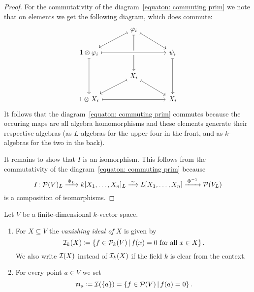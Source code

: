 \begin{proof}
    For the commutativity of the diagram~\eqref{equaton: commuting prim} we note that on elements we get the following diagram, which does commute:
    \[
      \begin{tikzcd}[column sep = large]
          {}
        & \varphi_i
          \arrow[mapsto]{dl}
          \arrow[mapsto]{dr}
          \arrow[mapsto]{dd}
        & {}
        \\
          1 \otimes \varphi_i
          \arrow[crossing over, mapsto]{rr}
          \arrow[mapsto]{dd}
        & {}
        & \psi_i
          \arrow[mapsto]{dd}
        \\
          {}
        & X_i
          \arrow[mapsto]{dl}
          \arrow[mapsto]{dr}
        & {}
        \\
          1 \otimes X_i
          \arrow[mapsto]{rr}
        & {}
        & X_i
      \end{tikzcd}
    \]
    It follows that the diagram~\eqref{equaton: commuting prim} commutes because the occuring maps are all algebra homomorphisms and these elements generate their respective algebras (as $L$-algebras for the upper four in the front, and as $k$-algebras for the two in the back).
    
    It remains to show that $I$ is an isomorphism.
    This follows from the commutativity of the diagram~\eqref{equaton: commuting prim} because
    \[
                                  I
      \colon                      \mathcal{P}(V)_L
      \xrightarrow{\,\Phi_L\,}    k[X_1, \dotsc, X_n]_L
      \xrightarrow{\,\sim\,}      L[X_1, \dotsc, X_n]
      \xrightarrow{\,\Phi^{-1}\,} \mathcal{P}(V_L)
    \]
    is a composition of isomorphisms.
\end{proof}


\begin{definition}
  Let $V$ be a finite-dimensional $k$-vector space.
  \begin{enumerate}
    \item
      For $X \subseteq V$ the \emph{vanishing ideal of $X$} is given by
      \[
        \mc{I}_k(X)
        \coloneqq \{
                    f \in \mc{P}_k(V)
                  \suchthat
                    \text{$f(x) = 0$ for all $x \in X$}
                  \} \,.
      \]
      We also write $\mathcal{I}(X)$ instead of $\mathcal{I}_k(X)$ if the field $k$ is clear from the context.
    \item
      For every point $a \in V$ we set
      \[
                  \mf{m}_a
        \coloneqq \mc{I}(\{a\})
        =         \{
                    f \in \mc{P}(V)
                  \suchthat
                    f(a) = 0
                  \} \,.
      \]
  \end{enumerate}
\end{definition}


